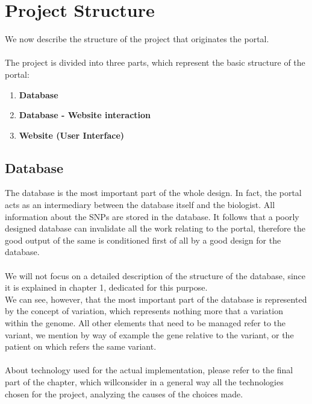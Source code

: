 \section{Project Structure}
We now describe the structure of the project that originates the portal. \\
\\The project is divided into three parts, which represent the basic structure of the portal:
\begin{enumerate}
  \item \textbf{Database}
  \item \textbf{Database - Website interaction}
  \item \textbf{Website (User Interface)}
\end{enumerate}

\subsection{Database}
The database is the most important part of the whole design. In fact, the portal acts as an intermediary between the database itself and the biologist. All information about the SNPs are stored in the database. It follows that a poorly designed database can invalidate all the work relating to the portal, therefore the good output of the same is conditioned first of all by a good design for the database. \\
\\We will not focus on a detailed description of the structure of the database, since it is explained in chapter 1, dedicated for this purpose. \\We can see, however, that the most important part of the database is represented by the concept of variation, which represents nothing more that a variation within the genome. All other elements that need to be managed refer to the variant, we mention by way of example the gene relative to the variant, or the patient on which refers the same variant. \\
\\About technology used for the actual implementation, please refer to the final part of the chapter, which willconsider in a general way all the technologies chosen for the project, analyzing the causes of the choices made.
  
